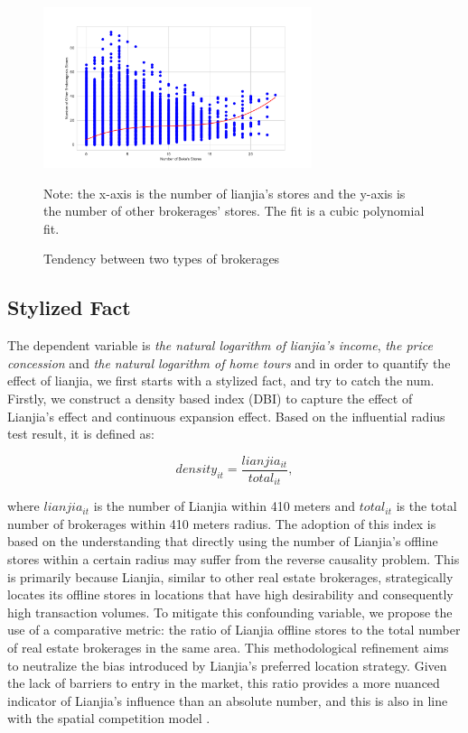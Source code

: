 \documentclass[12pt]{article}
\begin{document}
\begin{figure}
    \centering
    \includegraphics[width=0.7\textwidth]{../figures/scatter_plot_with_two_brokerages.pdf}
    \caption{Tendency between two types of brokerages}
    \label{fig:same_distribution}
    Note: the x-axis is the number of lianjia's stores and the y-axis is the number of other brokerages' stores. The fit is a cubic polynomial fit.
\end{figure}



\subsection{Stylized Fact} \label{subsec:stylized_fact}

The dependent variable is \emph{the natural logarithm of lianjia's income}, \emph{the price concession} and \emph{the natural logarithm of home tours} and in order to quantify the effect of lianjia, we first starts with a stylized fact, and try to catch the num. Firstly, we construct a density based index (DBI) to capture the effect of Lianjia's effect and continuous expansion effect. Based on the influential radius test result, it is defined as:

\begin{equation*}
  density_{it} = \frac{lianjia_{it}}{total_{it}},
\end{equation*}

where $lianjia_{it}$ is the number of Lianjia within 410 meters and $total_{it}$ is the total number of brokerages within 410 meters radius. The adoption of this index is based on the understanding that directly using the number of Lianjia's offline stores within a certain radius may suffer from the reverse causality problem. This is primarily because Lianjia, similar to other real estate brokerages, strategically locates its offline stores in locations that have high desirability and consequently high transaction volumes. To mitigate this confounding variable, we propose the use of a comparative metric: the ratio of Lianjia offline stores to the total number of real estate brokerages in the same area. This methodological refinement aims to neutralize the bias introduced by Lianjia's preferred location strategy. Given the lack of barriers to entry in the market, this ratio provides a more nuanced indicator of Lianjia's influence than an absolute number, and this is also in line with the spatial competition model \citep{hotelling_stability_1929, daspremont_hotellings_1979}.
\end{document}

